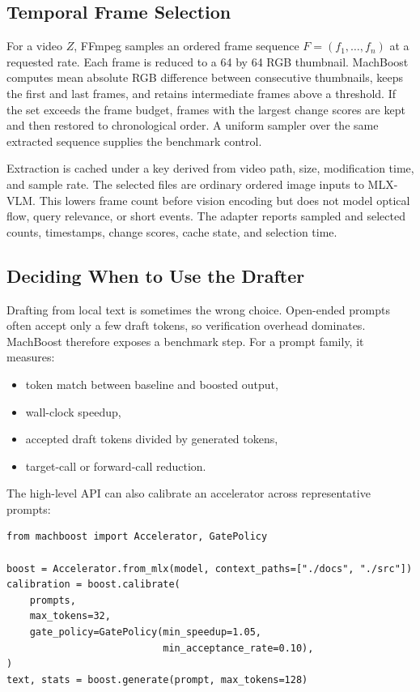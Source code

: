 \documentclass[11pt]{article}
\begin{document}
\subsection{Temporal Frame Selection}
For a video $Z$, FFmpeg samples an ordered frame sequence $F=(f_1,\ldots,f_n)$ at a requested rate. Each frame is reduced to a 64 by 64 RGB thumbnail. MachBoost computes mean absolute RGB difference between consecutive thumbnails, keeps the first and last frames, and retains intermediate frames above a threshold. If the set exceeds the frame budget, frames with the largest change scores are kept and then restored to chronological order. A uniform sampler over the same extracted sequence supplies the benchmark control.

Extraction is cached under a key derived from video path, size, modification time, and sample rate. The selected files are ordinary ordered image inputs to MLX-VLM. This lowers frame count before vision encoding but does not model optical flow, query relevance, or short events. The adapter reports sampled and selected counts, timestamps, change scores, cache state, and selection time.

\subsection{Deciding When to Use the Drafter}
Drafting from local text is sometimes the wrong choice. Open-ended prompts often accept only a few draft tokens, so verification overhead dominates. MachBoost therefore exposes a benchmark step. For a prompt family, it measures:
\begin{itemize}[leftmargin=*]
  \item token match between baseline and boosted output,
  \item wall-clock speedup,
  \item accepted draft tokens divided by generated tokens,
  \item target-call or forward-call reduction.
\end{itemize}

The high-level API can also calibrate an accelerator across representative prompts:
\begin{verbatim}
from machboost import Accelerator, GatePolicy

boost = Accelerator.from_mlx(model, context_paths=["./docs", "./src"])
calibration = boost.calibrate(
    prompts,
    max_tokens=32,
    gate_policy=GatePolicy(min_speedup=1.05,
                           min_acceptance_rate=0.10),
)
text, stats = boost.generate(prompt, max_tokens=128)
\end{verbatim}
\end{document}
